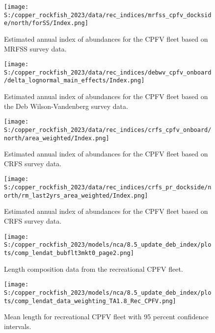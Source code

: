 \documentclass[11pt,
  english,
  letterpaper,
]{article}
\begin{document}
\begin{figure}
\centering
\texttt{[image: S:/copper\_rockfish\_2023/data/rec\_indices/mrfss\_cpfv\_dockside/north/forSS/Index.png]}
\caption{Estimated annual index of abundances for the CPFV fleet based on MRFSS survey data.\label{fig:mrfss-index-main}}
\end{figure}

\begin{figure}
\centering
\texttt{[image: S:/copper\_rockfish\_2023/data/rec\_indices/debwv\_cpfv\_onboard/delta\_lognormal\_main\_effects/Index.png]}
\caption{Estimated annual index of abundances for the CPFV fleet based on the Deb Wilson-Vandenberg survey data.\label{fig:dwv-index-main}}
\end{figure}

\begin{figure}
\centering
\texttt{[image: S:/copper\_rockfish\_2023/data/rec\_indices/crfs\_cpfv\_onboard/north/area\_weighted/Index.png]}
\caption{Estimated annual index of abundances for the CPFV fleet based on CRFS survey data.\label{fig:crfs-index-main}}
\end{figure}

\begin{figure}
\centering
\texttt{[image: S:/copper\_rockfish\_2023/data/rec\_indices/crfs\_pr\_dockside/north/rm\_last2yrs\_area\_weighted/Index.png]}
\caption{Estimated annual index of abundances for the CPFV fleet based on CRFS survey data.\label{fig:crfs-pr-index-main}}
\end{figure}

\begin{figure}
\centering
\texttt{[image: S:/copper\_rockfish\_2023/models/nca/8.5\_update\_deb\_index/plots/comp\_lendat\_bubflt3mkt0\_page2.png]}
\caption{Length composition data from the recreational CPFV fleet.\label{fig:rec-cpfv-len-data}}
\end{figure}

\begin{figure}
\centering
\texttt{[image: S:/copper\_rockfish\_2023/models/nca/8.5\_update\_deb\_index/plots/comp\_lendat\_data\_weighting\_TA1.8\_Rec\_CPFV.png]}
\caption{Mean length for recreational CPFV fleet with 95 percent confidence intervals.\label{fig:mean-rec-cpfv-len-data}}
\end{figure}
\end{document}
